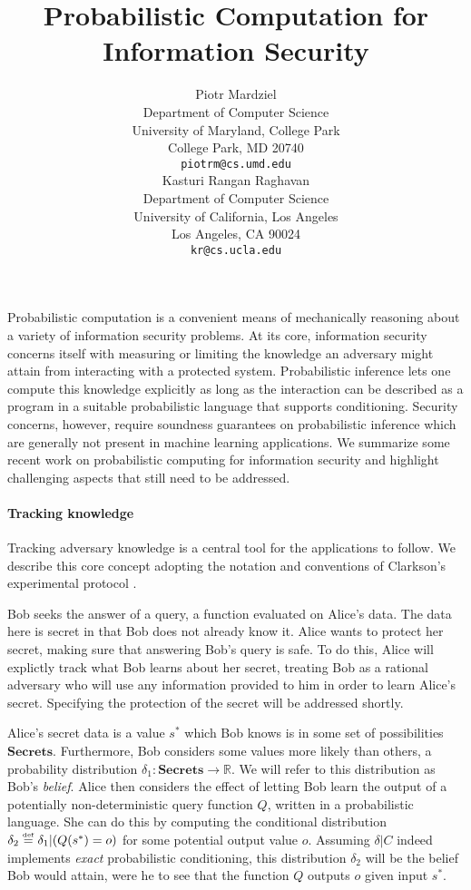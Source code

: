 \documentclass{article} %
\title{Probabilistic Computation for Information Security}
\author{
Piotr Mardziel\\
Department of Computer Science\\
University of Maryland, College Park\\
College Park, MD 20740 \\
\texttt{piotrm@cs.umd.edu} \\
\And
Kasturi Rangan Raghavan\\
Department of Computer Science\\
University of California, Los Angeles\\
Los Angeles, CA 90024\\
\texttt{kr@cs.ucla.edu} \\
}
\newcommand{\ra}{\rightarrow}
\newcommand{\Real}{\mathbb{R}}
\newcommand{\secrets}[0]{\textbf{Secrets}}
\newcommand{\asecret}[0]{s}
\newcommand{\rsecret}[0]{\asecret^*}
\newcommand{\cond}[0]{|}
\newcommand{\stacklabel}[1]{\stackrel{\smash{\scriptscriptstyle \mathrm{#1}}}}
\newcommand{\defeq}{\stacklabel{def}=}
\theoremstyle{plain} %
\theoremstyle{definition} %
\begin{document}
\maketitle

Probabilistic computation is a convenient means of mechanically
reasoning about a variety of information security problems. At its
core, information security concerns itself with measuring or limiting
the knowledge an adversary might attain from interacting with a
protected system. Probabilistic inference lets one compute this
knowledge explicitly as long as the interaction can be described as a
program in a suitable probabilistic language that supports
conditioning. Security concerns, however, require soundness guarantees
on probabilistic inference which are generally not present in machine
learning applications. We summarize some recent work on probabilistic
computing for information security and highlight challenging aspects
that still need to be addressed.

\paragraph*{Tracking knowledge}

Tracking adversary knowledge is a central tool for the applications to
follow. We describe this core concept adopting the notation and
conventions of Clarkson's experimental protocol
\cite{clarkson09quantifying}.

Bob seeks the answer of a query, a function evaluated on Alice's data.
The data here is secret in that Bob does not already know it.
Alice wants to protect her secret, making sure that answering
Bob's query is safe.
To do this, Alice will explictly track what Bob
learns about her secret, treating Bob as a rational adversary
who will use any information provided to him in order to learn Alice's
secret. Specifying the protection of the secret will be addressed shortly.

Alice's secret data is a value $ \rsecret $ which Bob knows is in some
set of possibilities $ \secrets $. Furthermore, Bob considers some
values more likely than others, a probability distribution $ \delta_1
: \secrets \ra \Real $. We will refer to this distribution as Bob's
\emph{belief}. Alice then considers the effect of letting Bob learn
the output of a potentially non-deterministic query function $ Q $, written
in a probabilistic language. She can do this by computing the
conditional distribution $ \delta_2 \defeq \delta_1 \cond (Q(\rsecret)
= o) $ for some potential output value $ o $. Assuming $ \delta | C $
indeed implements \emph{exact} probabilistic conditioning, this
distribution $ \delta_2 $ will be the belief Bob would attain, were he
to see that the function $ Q $ outputs $ o $ given input $ \rsecret $.
\end{document}
